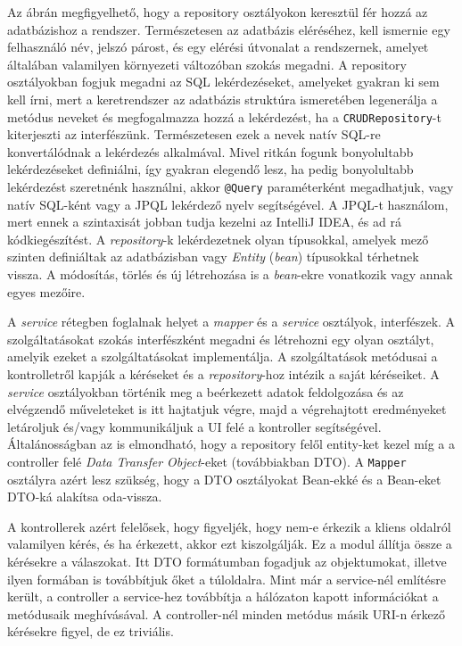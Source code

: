 Az ábrán megfigyelhető, hogy a repository osztályokon keresztül fér hozzá az adatbázishoz a rendszer. Természetesen az adatbázis eléréséhez, kell ismernie egy felhasználó név, jelszó párost, és egy elérési útvonalat a rendszernek, amelyet általában valamilyen környezeti változóban szokás megadni. A repository osztályokban fogjuk megadni az SQL lekérdezéseket, amelyeket gyakran ki sem kell írni, mert a keretrendszer az adatbázis struktúra ismeretében legenerálja a metódus neveket és megfogalmazza hozzá a lekérdezést, ha a \texttt{CRUDRepository}-t kiterjeszti az interfészünk. Természetesen ezek a nevek natív SQL-re konvertálódnak a lekérdezés alkalmával. Mivel ritkán fogunk bonyolultabb lekérdezéseket definiálni, így gyakran elegendő lesz, ha pedig bonyolultabb lekérdezést szeretnénk használni, akkor \texttt{@Query} paraméterként megadhatjuk, vagy natív SQL-ként vagy a JPQL lekérdező nyelv segítségével. A JPQL-t használom, mert ennek a szintaxisát jobban tudja kezelni az IntelliJ IDEA, és ad rá kódkiegészítést. A \textit{repository}-k lekérdezetnek olyan típusokkal, amelyek mező szinten definiáltak az adatbázisban vagy \textit{Entity} (\textit{bean}) típusokkal térhetnek vissza. A módosítás, törlés és új létrehozása is a \textit{bean}-ekre vonatkozik vagy annak egyes mezőire.

A \textit{service} rétegben foglalnak helyet a \textit{mapper} és a \textit{service} osztályok, interfészek. A szolgáltatásokat szokás interfészként megadni és létrehozni egy olyan osztályt, amelyik ezeket a szolgáltatásokat implementálja. A szolgáltatások metódusai a kontrolletről kapják a kéréseket és a \textit{repository}-hoz intézik a saját kéréseiket.  A \textit{service} osztályokban történik meg a beérkezett adatok feldolgozása és az elvégzendő műveleteket is itt hajtatjuk végre, majd a végrehajtott eredményeket letároljuk és/vagy kommunikáljuk a UI felé a kontroller segítségével. Általánosságban az is elmondható, hogy a repository felől entity-ket kezel míg a a controller felé \textit{Data Transfer Object}-eket (továbbiakban DTO). A \texttt{Mapper} osztályra azért lesz szükség, hogy a DTO osztályokat Bean-ekké és a Bean-eket DTO-ká alakítsa oda-vissza.

A kontrollerek azért felelősek, hogy figyeljék, hogy nem-e érkezik a kliens oldalról valamilyen kérés, és ha érkezett, akkor ezt kiszolgálják. Ez a modul állítja össze a kérésekre a válaszokat. Itt DTO formátumban fogadjuk az objektumokat, illetve ilyen formában is továbbítjuk őket a túloldalra. Mint már a service-nél említésre került, a controller a service-hez továbbítja a hálózaton kapott információkat a metódusaik meghívásával. A controller-nél minden metódus másik URI-n érkező kérésekre figyel, de ez triviális.

